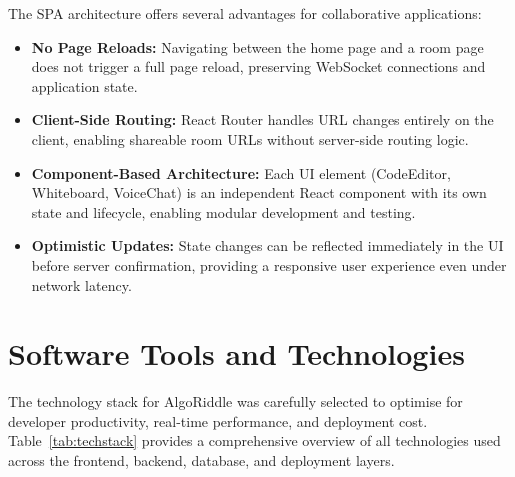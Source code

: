 The SPA architecture offers several advantages for collaborative applications:

\begin{itemize}
    \item \textbf{No Page Reloads:} Navigating between the home page and a room page does not trigger a full page reload, preserving WebSocket connections and application state.
    \item \textbf{Client-Side Routing:} React Router handles URL changes entirely on the client, enabling shareable room URLs without server-side routing logic.
    \item \textbf{Component-Based Architecture:} Each UI element (CodeEditor, Whiteboard, VoiceChat) is an independent React component with its own state and lifecycle, enabling modular development and testing.
    \item \textbf{Optimistic Updates:} State changes can be reflected immediately in the UI before server confirmation, providing a responsive user experience even under network latency.
\end{itemize}

\section{Software Tools and Technologies}

The technology stack for AlgoRiddle was carefully selected to optimise for developer productivity, real-time performance, and deployment cost. Table~\ref{tab:techstack} provides a comprehensive overview of all technologies used across the frontend, backend, database, and deployment layers.

